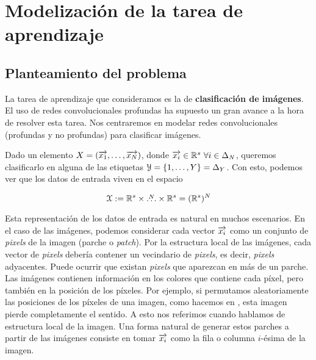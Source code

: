 \chapter{Modelización de la tarea de aprendizaje} \label{ch:tarea_aprendizaje}

\section{Planteamiento del problema} \label{seq:planteamiento_problema}

La tarea de aprendizaje que consideramos es la de \textbf{clasificación de imágenes}. El uso de redes convolucionales profundas ha supuesto un gran avance a la hora de resolver esta tarea. Nos centraremos en modelar redes convolucionales (profundas y no profundas) para clasificar imágenes.

Dado un elemento $X = (\overrightarrow{x_1}, \ldots, \overrightarrow{x_N})$, donde $\nv{x_i} \in \R^s \ \forall i \in \deltaset{N}$, queremos clasificarlo en alguna de las etiquetas $\mathcal{Y} = \{1, \ldots, Y \} = \Delta_{Y}$. Con esto, podemos ver que los datos de entrada viven en el espacio

\begin{equation}
	\mathcal{X} := \mathbb{R}^s \times \overset{N}{\ldots} \times \mathbb{R}^s = (\mathbb{R}^s)^N
\end{equation}

Esta representación de los datos de entrada es natural en muchos escenarios. En el caso de las imágenes, podemos considerar cada vector $\overrightarrow{x_i}$ como un conjunto de \textit{pixels} de la imagen (parche o \textit{patch}). Por la estructura local de las imágenes, cada vector de \textit{pixels} debería contener un vecindario de \textit{pixels}, es decir, \textit{pixels} adyacentes. Puede ocurrir que existan \textit{pixels} que aparezcan en más de un parche. Las imágenes contienen información en los colores que contiene cada píxel, pero también en la posición de los píxeles. Por ejemplo, si permutamos aleatoriamente las posiciones de los píxeles de una imagen, como hacemos en , esta imagen pierde completamente el sentido. A esto nos referimos cuando hablamos de estructura local de la imagen. Una forma natural de generar estos parches a partir de las imágenes consiste en tomar $\overrightarrow{x_i}$ como la fila o columna $i$-ésima de la imagen.

